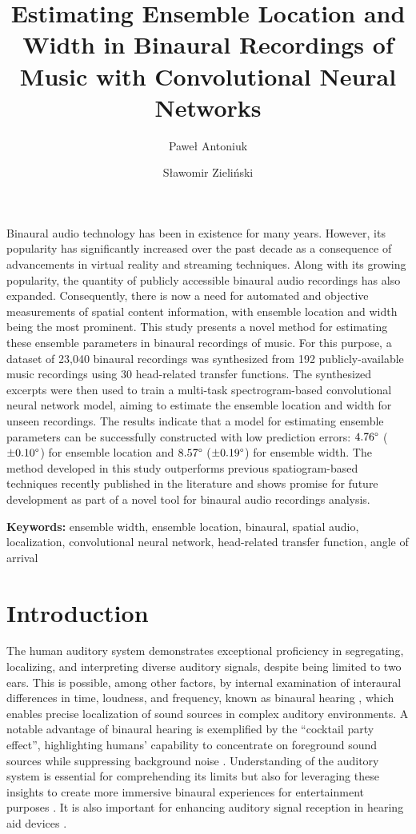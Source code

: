 \documentclass[11pt]{article}
\title{Estimating Ensemble Location and Width in Binaural Recordings of Music with Convolutional Neural Networks}
\author[1,*]{Paweł Antoniuk\orcidlink{0000-0002-0914-8920}}
\author[1]{Sławomir Zieliński\orcidlink{0000-0002-3205-974X}}
\affil[1]{Faculty of Computer Science, Białystok University of Technology \protect\\ Wiejska 45A, 15-351 Białystok, Poland}
\affil[*]{Corresponding Author Email: pawel.antoniuk@sd.pb.edu.pl}
\date{}
\renewenvironment{abstract}{}{}
\newcommand{\keywords}[1]{
  \noindent\begin{center}\begin{minipage}{\textwidth}
  \small\textbf{Keywords:} #1
  \end{minipage}\end{center}
}
\begin{document}
\maketitle

\begin{abstract}
  Binaural audio technology has been in existence for many years. However, its popularity has significantly increased over the past decade as a consequence of advancements in virtual reality and streaming techniques. Along with its growing popularity, the quantity of publicly accessible binaural audio recordings has also expanded. Consequently, there is now a need for automated and objective measurements of spatial content information, with ensemble location and width being the most prominent. This study presents a novel method for estimating these ensemble parameters in binaural recordings of music. For this purpose, a dataset of 23,040 binaural recordings was synthesized from 192 publicly-available music recordings using 30 head-related transfer functions. The synthesized excerpts were then used to train a multi-task spectrogram-based convolutional neural network model, aiming to estimate the ensemble location and width for unseen recordings. The results indicate that a model for estimating ensemble parameters can be successfully constructed with low prediction errors: $4.76\degree$ ($\pm0.10\degree$) for ensemble location and $8.57\degree$ ($\pm0.19\degree$) for ensemble width. The method developed in this study outperforms previous spatiogram-based techniques recently published in the literature and shows promise for future development as part of a novel tool for binaural audio recordings analysis.
\end{abstract}

\keywords{ensemble width, ensemble location, binaural, spatial audio, localization, convolutional neural network, head-related transfer function, angle of arrival}

\section{Introduction}

The human auditory system demonstrates exceptional proficiency in segregating, localizing, and interpreting diverse auditory signals, despite being limited to two ears. This is possible, among other factors, by internal examination of interaural differences in time, loudness, and frequency, known as binaural hearing \parencite{blauert_spatial_1996}, which enables precise localization of sound sources in complex auditory environments. A notable advantage of binaural hearing is exemplified by the ``cocktail party effect'', highlighting humans' capability to concentrate on foreground sound sources while suppressing background noise \parencite{cherry_experiments_1953}. Understanding of the auditory system is essential for comprehending its limits but also for leveraging these insights to create more immersive binaural experiences for entertainment purposes \parencite{zhang_surround_2017}. It is also important for enhancing auditory signal reception in hearing aid devices \parencite{hirsh_binaural_1950, thiemann_speech_2016}.
\end{document}
